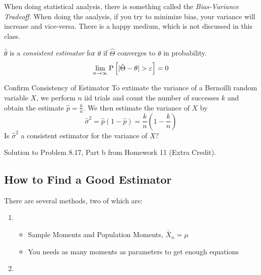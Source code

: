 			\begin{remark*}
				When doing statistical analysis, there is something called the \emph{Bias-Variance Tradeoff}.
				When doing the analysis, if you try to minimize bias, your variance will increase and vice-versa.
				There is a happy medium, which is not discussed in this class.
			\end{remark*}
		
			\begin{definition}[Consistency] \label{def:Consistency}
				$\hat{\theta}$ is a \emph{consistent estimator} for $\theta$ if $\hat{\Theta}$ converges to $\theta$ in probability.
				\begin{equation} \label{eq:Consistency}
					\lim\limits_{n \rightarrow \infty} \operatorname{\operatorname{P}} \left[ \lvert \hat{\Theta} - \theta \rvert > \varepsilon \right] = 0
				\end{equation}
			\end{definition}
			\begin{example}[Problem 8.17]{Confirm Consistency of Estimator}
                          To extimate the variance of a Bernoilli random variable $X$, we perform $n$ iid trials and count the number of successes $k$ and obtain the estimate $\hat{p} = \frac{k}{n}$.
                          We then estimate the variance of $X$ by
                          \begin{equation*}
                            \hat{\sigma}^{2} = \hat{p} \left( 1-\hat{p} \right) = \frac{k}{n} \left( 1- \frac{k}{n} \right)
                          \end{equation*}
                          Is $\hat{\sigma}^{2}$ a consistent estimator for the variance of $X$?

                          \tcblower

                          Solution to Problem 8.17, Part b from Homework 11 (Extra Credit).
			\end{example}
	
	\subsection{How to Find a Good Estimator} \label{subsec:Find Good Estimator}
	There are several methods, two of which are:
		\begin{enumerate}
			\item {}
				\begin{itemize}[noitemsep, nolistsep]
					\item Sample Moments and Population Moments, $\bar{X}_{n} = \mu$
					\item You needs as many moments as parameters to get enough equations
				\end{itemize}
			\item {}
		\end{enumerate}
	
